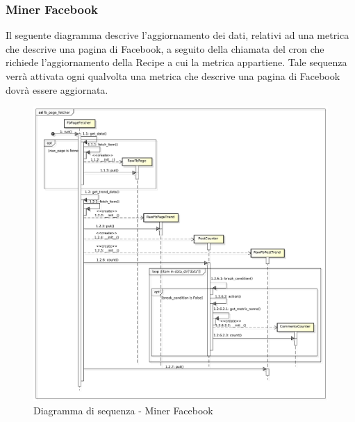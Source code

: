 	\subsubsection{Miner Facebook} %
    \label{ssub:miner_facebook}
    Il seguente diagramma descrive l'aggiornamento dei dati, relativi ad una metrica che descrive una pagina di Facebook, a seguito della chiamata del cron che richiede l'aggiornamento della Recipe a cui la metrica appartiene. Tale sequenza verrà attivata ogni qualvolta una metrica che descrive una pagina di Facebook dovrà essere aggiornata. \newline

    \begin{figure}[!htbp]
		\centering
			\centerline{\includegraphics[scale=0.4]{./images/sequence_diagram/fb_page_fetcher.pdf}}
		\caption{Diagramma di sequenza - Miner Facebook}
	\end{figure}


